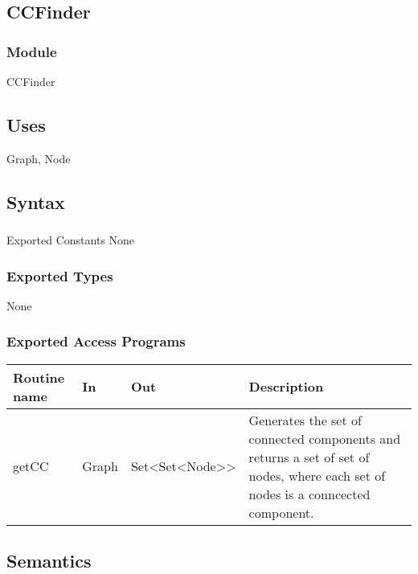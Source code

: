 \documentclass[12pt]{article}
\begin{document}
                \subsection* {CCFinder}
                
                \subsubsection*{Module}
                CCFinder
                
                \subsection* {Uses}
                Graph, Node
                
                \subsection* {Syntax}
                
                \subsubsection*{} {Exported Constants}
                None

                \subsubsection* {Exported Types}
                None

                \subsubsection* {Exported Access Programs}
                
                
                \begin{tabular}{| l | l | l | p{5cm} |}
                \hline
                \textbf{Routine name} & \textbf{In} & \textbf{Out} & \textbf{Description}\\
                \hline
                getCC & Graph & Set<Set<Node>> & Generates the set of connected components and returns a set of set of nodes, where
                each set of nodes is a conncected component.\\
                \hline
                \end{tabular}
                
                \subsection* {Semantics}
\end{document}

